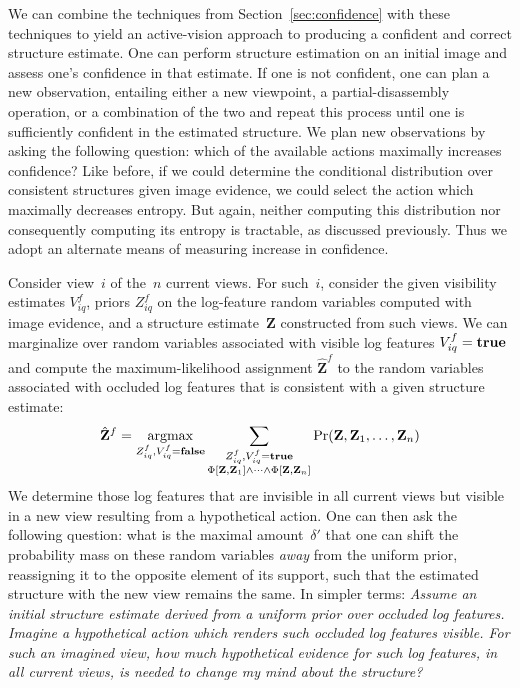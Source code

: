 We can combine the techniques from Section~\ref{sec:confidence} with these
techniques to yield an active-vision \cite{Bajcsy1988} approach to producing a
confident and correct structure estimate.
%
One can perform structure estimation on an initial image and assess one's
confidence in that estimate.
%
If one is not confident, one can plan a new observation, entailing either a new
viewpoint, a partial-disassembly operation, or a combination of the two and
repeat this process until one is sufficiently confident in the estimated
structure.
%
We plan new observations by asking the following question: which of the
available actions maximally increases confidence?
%
Like before, if we could determine the conditional distribution over consistent
structures given image evidence, we could select the action which maximally
decreases entropy.
%
But again, neither computing this distribution nor consequently computing its
entropy is tractable, as discussed previously.
%
Thus we adopt an alternate means of measuring increase in confidence.

Consider view~$i$ of the~$n$ current views.
%
For such~$i$, consider the given visibility estimates $V^f_{iq}$, priors
$Z^f_{iq}$ on the log-feature random variables computed with image evidence,
and a structure estimate~$\mathbf{Z}$ constructed from such views.
%
We can marginalize over random variables associated with visible log features
$V^f_{iq} = \mathbf{true}$ and compute the maximum-likelihood assignment
$\hat{\mathbf{Z}}^f$ to the random variables associated with occluded log
features that is consistent with a given structure estimate:
%
\begin{equation*}
  \hat{\mathbf{Z}}^f=\operatorname*{argmax}_{\substack{Z^f_{iq},V^f_{iq}=\mathbf{false}}}
  \sum_{\substack{Z^f_{iq},V^f_{iq}=\mathbf{true}\\
      \Phi[\mathbf{Z},\mathbf{Z}_1]\wedge\cdots\wedge\Phi[\mathbf{Z},\mathbf{Z}_n]}}
  \Pr(\mathbf{Z},\mathbf{Z}_1,\ldots,\mathbf{Z}_n)
\end{equation*}
%
We determine those log features that are invisible in all current views but
visible in a new view resulting from a hypothetical action.
%
One can then ask the following question: what is the maximal amount~$\delta'$
that one can shift the probability mass on these random variables \emph{away}
from the uniform prior, reassigning it to the opposite element of its support,
such that the estimated structure with the new view remains the same.
%
In simpler terms: \emph{Assume an initial structure estimate derived from a
  uniform prior over occluded log features.
  Imagine a hypothetical action which renders such occluded log features
  visible.
  For such an imagined view, how much hypothetical evidence for such log
  features, in all current views, is needed to change my mind about the
  structure?}


